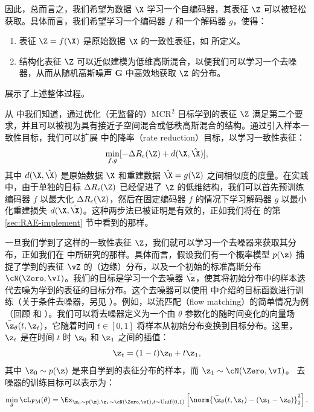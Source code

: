\documentclass[../../book-main_zh.tex]{subfiles}
\begin{document}
因此，总而言之，我们希望为数据 $\X$ 学习一个自编码器，其表征 $\Z$ 可以被轻松获取。具体而言，我们希望学习一个编码器 $f$ 和一个解码器 $g$，使得：
\begin{enumerate}
    \item 表征 $\Z = f(\X)$ 是原始数据 $\X$ 的一致性表征，如  所定义。
    \item 结构化表征 $\Z$ 可以近似建模为低维高斯混合，以便我们可以学习一个去噪器，从而从随机高斯噪声 $\boldsymbol{G}$ 中高效地获取 $\Z$ 的分布。
\end{enumerate}
 展示了上述整体过程。

从  中我们知道，通过优化（无监督的）MCR$^2$ 目标学到的表征 $\Z$ 满足第二个要求，并且可以被视为具有接近子空间混合或低秩高斯混合的结构。通过引入样本一致性目标，我们可以扩展  中的降率（rate reduction）目标，以学习一致性表征：
\begin{equation}
    \min_{f, g}
    [ - \Delta R_{\epsilon}(\Z) + d(\X, \hat \X)],
    \label{eqn:autoencode-consistent}
\end{equation}
其中 $d(\X, \hat \X)$ 是原始数据 $\X$ 和重建数据 $\hat \X = g(\Z)$ 之间相似度的度量。在实践中，由于单独的目标 $\Delta R_{\epsilon}(\Z)$ 已经促进了 $\Z$ 的低维结构，我们可以首先预训练编码器 $f$ 以最大化 $\Delta R_{\epsilon}(\Z)$，然后在固定编码器 $f$ 的情况下学习解码器 $g$ 以最小化重建损失 $d(\X, \hat \X)$。这种两步法已被证明是有效的，正如我们将在  的第 \ref{sec:RAE-implement} 节中看到的那样。

一旦我们学到了这样的一致性表征 $\Z$，我们就可以学习一个去噪器来获取其分布，正如我们在  中所研究的那样。具体而言，假设我们有一个概率模型 $p(\z)$ 捕捉了学到的表征 $\vZ$ 的（边缘）分布，以及一个初始的标准高斯分布 $\cN(\Zero, \vI)$。我们的目标是学习一个去噪器 $\bar{\z}$，使其将初始分布中的样本迭代去噪为学到的表征的目标分布。这个去噪器可以使用  中介绍的目标函数进行训练（关于条件去噪器，另见 ）。例如，以流匹配（flow matching）的简单情况为例（回顾  和 ）。我们可以将去噪器定义为一个由 $\theta$ 参数化的随时间变化的向量场 $\bar{\z}_{\theta}(t, \z_t)$，它随着时间 $t \in [0, 1]$ 将样本从初始分布变换到目标分布。这里，$\z_t$ 是在时间 $t$ 时 $\z_0$ 和 $\z_1$ 之间的插值：
\begin{equation}
    \z_t = (1 - t)\z_0 + t\z_1,
\end{equation}
其中 $\z_0 \sim p(\z)$ 是来自学到的表征分布的样本，而 $\z_1 \sim \cN(\Zero, \vI)$。
去噪器的训练目标可以表示为：
\begin{equation}
    \min_{\theta} \cL_{\mathrm{FM}}(\theta) = \Ex_{\z_0 \sim p(\z), \z_1 \sim
    \cN(\Zero, \vI), t \sim \mathrm{Unif}(0, 1)} \left[
    \norm{\bar{\z}_{\theta}(t,\z_t) - (\z_1 - \z_0)}_2^2 \right].
\end{equation}
\end{document}

